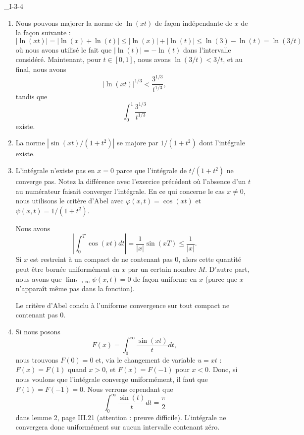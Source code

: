\begin{corrige}{_I-3-4}
\begin{enumerate}
\item 
	Nous pouvons majorer la norme de $\ln(xt)$ de façon indépendante de $x$ de la façon suivante :
	\begin{equation}
		| \ln(xt) |=| \ln(x)+\ln(t) |\leq| \ln(x) |+| \ln(t) |\leq\ln(3)-\ln(t)=\ln(3/t)
	\end{equation}
	où nous avons utilisé le fait que $|\ln(t)|=-\ln(t)$ dans l'intervalle considéré. Maintenant, pour $t\in[0,1]$, nous avons $\ln(3/t)<3/t$, et au final, nous avons
	\begin{equation}
		| \ln(xt) |^{1/3}<\frac{ 3^{1/3} }{ t^{1/3} },
	\end{equation}
	tandis que
	\begin{equation}
		\int_0^1\frac{ 3^{1/3} }{ t^{1/3} }
	\end{equation}
	existe.

\item
	La norme $| \sin(xt)/(1+t^2) |$ se majore par $1/(1+t^2)$ dont l'intégrale existe.
\item
	L'intégrale n'existe pas en $x=0$ parce que l'intégrale de $t/(1+t^2)$ ne converge pas. Notez la différence avec l'exercice précédent où l'absence d'un $t$ au numérateur faisait converger l'intégrale. En ce qui concerne le cas $x\neq 0$, nous utilisons le critère d'Abel avec $\varphi(x,t)=\cos(xt)$ et $\psi(x,t)=1/(1+t^2)$.

Nous avons
\begin{equation}
	|\int_0^T\cos(xt)dt |=\frac{1}{ | x | }\sin(xT)\leq \frac{1}{ | x | }.
\end{equation}
Si $x$ est restreint à un compact de ne contenant pas $0$, alors cette quantité peut être bornée uniformément en $x$ par un certain nombre $M$. D'autre part, nous avons que $\lim_{t\to\infty}\psi(x,t)=0$ de façon uniforme en $x$ (parce que $x$ n'apparaît même pas dans la fonction).

Le critère d'Abel conclu à l'uniforme convergence sur tout compact ne contenant pas $0$.

\item 
Si nous posons 
\begin{equation}
	F(x)=\int_0^{\infty}\frac{ \sin(xt) }{ t }dt,
\end{equation}
nous trouvons $F(0)=0$ et, via le changement de variable $u=xt$ : $F(x)=F(1)$ quand $x>0$, et $F(x)=F(-1)$ pour $x<0$. Donc, si nous voulons que l'intégrale converge uniformément, il faut que $F(1)=F(-1)=0$. Nous verrons cependant que
\begin{equation}		\label{EqIntSinSurt}
	\int_0^{\infty}\frac{ \sin(t) }{ t }dt=\frac{ \pi }{ 2 }
\end{equation}
dans lemme 2, page III.21 (attention : preuve difficile). L'intégrale ne convergera donc uniformément sur aucun intervalle contenant zéro.


\end{enumerate}
\end{corrige}
